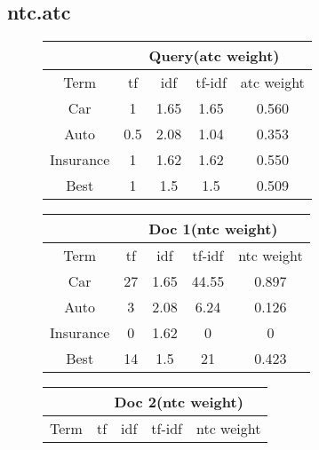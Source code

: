 \documentclass[11pt]{article}
\begin{document}
\subsection*{ntc.atc}
\begin{figure}[H]
  \begin{minipage}{0.5\linewidth}
    \begin{table}[H]
      \centering
      \begin{tabular}{|c|c|c|c|c|} \hline
        & \multicolumn{4}{|c|}{Query(atc weight)}\\ \hline
        Term         & tf& idf  & tf-idf & atc weight \\ \hline
        Car          & 1 & 1.65 & 1.65& 0.560 \\ \hline
        Auto         & 0.5 & 2.08 & 1.04& 0.353 \\ \hline
        Insurance    & 1 & 1.62 & 1.62& 0.550\\ \hline
        Best         & 1 & 1.5  & 1.5 & 0.509\\ \hline
      \end{tabular}
    \end{table}
  \end{minipage}
  \begin{minipage}{0.5\linewidth}
    \begin{table}[H]
      \centering
      \begin{tabular}{|c|c|c|c|c|} \hline
        & \multicolumn{4}{|c|}{Doc 1(ntc weight)}\\ \hline
        Term     & tf & idf & tf-idf & ntc weight \\ \hline
        Car      & 27 &1.65& 44.55& 0.897 \\ \hline
        Auto     & 3  &2.08& 6.24 & 0.126\\ \hline
        Insurance& 0  &1.62& 0    & 0\\ \hline
        Best     & 14 &1.5 & 21   & 0.423\\ \hline
      \end{tabular}
    \end{table}
  \end{minipage}
  \begin{minipage}{0.5\linewidth}
    \begin{table}[H]
      \centering
      \begin{tabular}{|c|c|c|c|c|} \hline
        & \multicolumn{4}{|c|}{Doc 2(ntc weight)}\\ \hline
        Term     & tf & idf & tf-idf & ntc weight \\ \hline

\end{tabular}
\end{table}
\end{minipage}
\end{figure}
\end{document}
